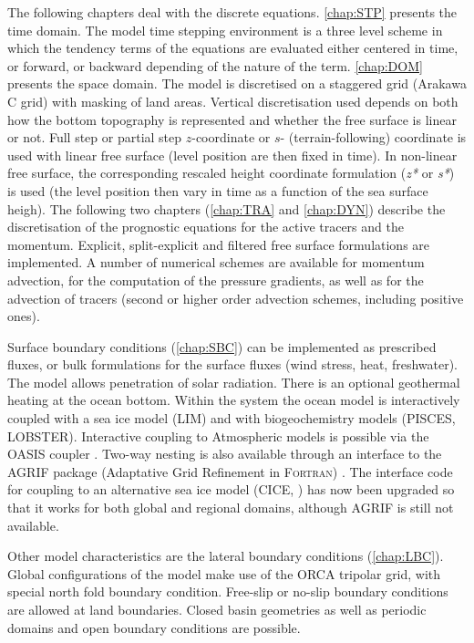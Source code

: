 \documentclass[../main/NEMO_manual]{subfiles}
\begin{document}
The following chapters deal with the discrete equations.
\autoref{chap:STP} presents the time domain.
The model time stepping environment is a three level scheme in which the tendency terms of
the equations are evaluated either centered in time, or forward, or backward depending of the nature of the term.
\autoref{chap:DOM} presents the space domain.
The model is discretised on a staggered grid (Arakawa C grid) with masking of land areas.
Vertical discretisation used depends on both how the bottom topography is represented and
whether the free surface is linear or not.
Full step or partial step $z$-coordinate or $s$- (terrain-following) coordinate is used with
linear free surface (level position are then fixed in time).
In non-linear free surface,
the corresponding rescaled height coordinate formulation (\textit{z*} or \textit{s*}) is used
(the level position then vary in time as a function of the sea surface heigh).
The following two chapters (\autoref{chap:TRA} and \autoref{chap:DYN}) describe the discretisation of
the prognostic equations for the active tracers and the momentum.
Explicit, split-explicit and filtered free surface formulations are implemented.
A number of numerical schemes are available for momentum advection, for the computation of the pressure gradients,
as well as for the advection of tracers (second or higher order advection schemes, including positive ones).

Surface boundary conditions (\autoref{chap:SBC}) can be implemented as prescribed fluxes,
or bulk formulations for the surface fluxes (wind stress, heat, freshwater).
The model allows penetration of solar radiation.
There is an optional geothermal heating at the ocean bottom.
Within the \NEMO system the ocean model is interactively coupled with a sea ice model (LIM) and
with biogeochemistry models (PISCES, LOBSTER).
Interactive coupling to Atmospheric models is possible via the OASIS coupler \citep{OASIS2006}.
Two-way nesting is also available through an interface to the AGRIF package
(Adaptative Grid Refinement in \textsc{Fortran}) \citep{Debreu_al_CG2008}.
The interface code for coupling to an alternative sea ice model (CICE, \citet{Hunke2008}) has now been upgraded so
that it works for both global and regional domains, although AGRIF is still not available.

Other model characteristics are the lateral boundary conditions (\autoref{chap:LBC}).
Global configurations of the model make use of the ORCA tripolar grid, with special north fold boundary condition.
Free-slip or no-slip boundary conditions are allowed at land boundaries.
Closed basin geometries as well as periodic domains and open boundary conditions are possible. 
\end{document}
